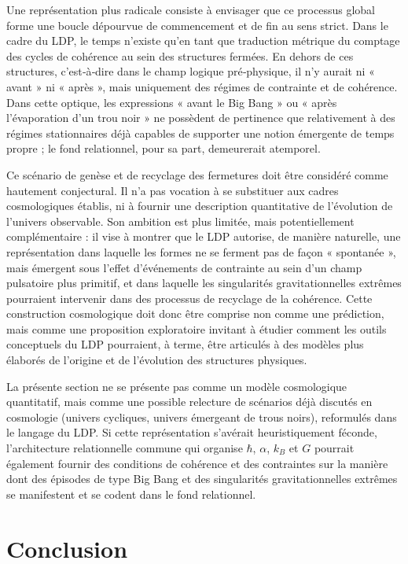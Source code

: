 \documentclass[11pt,a4paper]{article}
\begin{document}
Une représentation plus radicale consiste à envisager que ce processus global forme une boucle dépourvue de commencement et de fin au sens strict. Dans le cadre du LDP, le temps n’existe qu’en tant que traduction métrique du comptage des cycles de cohérence au sein des structures fermées. En dehors de ces structures, c’est‑à‑dire dans le champ logique pré‑physique, il n’y aurait ni « avant » ni « après », mais uniquement des régimes de contrainte et de cohérence. Dans cette optique, les expressions « avant le Big Bang » ou « après l’évaporation d’un trou noir » ne possèdent de pertinence que relativement à des régimes stationnaires déjà capables de supporter une notion émergente de temps propre ; le fond relationnel, pour sa part, demeurerait atemporel.

Ce scénario de genèse et de recyclage des fermetures doit être considéré comme hautement conjectural. Il n’a pas vocation à se substituer aux cadres cosmologiques établis, ni à fournir une description quantitative de l’évolution de l’univers observable. Son ambition est plus limitée, mais potentiellement complémentaire : il vise à montrer que le LDP autorise, de manière naturelle, une représentation dans laquelle les formes ne se ferment pas de façon « spontanée », mais émergent sous l’effet d’événements de contrainte au sein d’un champ pulsatoire plus primitif, et dans laquelle les singularités gravitationnelles extrêmes pourraient intervenir dans des processus de recyclage de la cohérence. Cette construction cosmologique doit donc être comprise non comme une prédiction, mais comme une proposition exploratoire invitant à étudier comment les outils conceptuels du LDP pourraient, à terme, être articulés à des modèles plus élaborés de l’origine et de l’évolution des structures physiques.

La présente section ne se présente pas comme un modèle cosmologique quantitatif, mais comme une possible relecture de scénarios déjà discutés en cosmologie (univers cycliques, univers émergeant de trous noirs), reformulés dans le langage du LDP. Si cette représentation s’avérait heuristiquement féconde, l’architecture relationnelle commune qui organise \(\hbar\), \(\alpha\), \(k_B\) et \(G\) pourrait également fournir des conditions de cohérence et des contraintes sur la manière dont des épisodes de type Big Bang et des singularités gravitationnelles extrêmes se manifestent et se codent dans le fond relationnel.

\section*{Conclusion}
\end{document}
